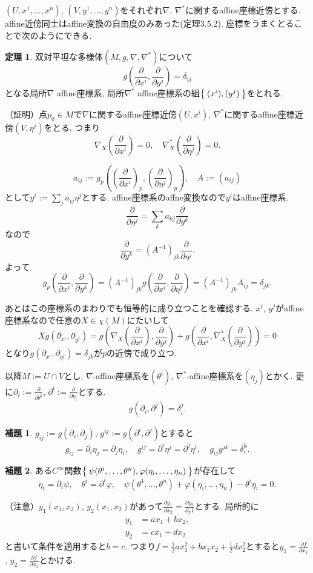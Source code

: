 \documentclass{jsarticle}
\newcommand{\half}{\frac{1}{2}}
\newcommand{\con}{\nabla}
\newcommand{\dcon}{\con^{*}}
\newcommand{\marud}[1]{\partial_{#1}}
\newcommand{\marudd}[1]{\frac{\partial}{\partial #1}}
\theoremstyle{definition}
\newtheorem{theorem}{定理}
\newtheorem{lemma}{補題}
\numberwithin{theorem}{section}
\begin{document}
$(U, x^1, \dots, x^n)$, $(V, y^1, \dots, y^n)$をそれぞれ$\con$, $\dcon$に関するaffine座標近傍とする.
affine近傍同士はaffine変換の自由度のみあった(定理3.5.2).
座標をうまくとることで次のようにできる.
\begin{theorem}
双対平坦な多様体$(M,g,\con,\dcon)$について
\[
g(\marudd{x^i}, \marudd{y^j})=\delta_{ij}
\]
となる局所$\con$ affine座標系, 局所$\dcon$ affine座標系の組$\Set{(x^i),(y^j)}$をとれる.
\end{theorem}

（証明）点$p_0 \in M$で$\con$に関するaffine座標近傍$(U,x^i)$, $\dcon$に関するaffine座標近傍$(V,\eta^j)$をとる.
つまり
\[
\con_X\left(\marudd{x^i}\right)=0, \quad \dcon_X\left(\marudd{\eta^j}\right)=0.
\]

\[
a_{ij}:=g_p((\marudd{x^i})_p, (\marudd{\eta^j})_p), \quad A:=(a_{ij})
\]
として$y^i:=\sum_j a_{ij} \eta^j$とする.
affine座標系のaffne変換なので$y^i$はaffine座標系.
\[
\marudd{\eta^j}=\sum_k a_{kj} \marudd{y^k}
\]
なので
\[
\marudd{y^k}=(A^{-1})_{jk} \marudd{\eta^j}.
\]
よって
\[
g_p(\marudd{x^i},\marudd{y^k})=(A^{-1})_{jk}g(\marudd{x^i},\marudd{\eta^j})=(A^{-1})_{jk}A_{ij}=\delta_{jk}.
\]

あとはこの座標系のまわりでも恒等的に成り立つことを確認する.
$x^i$, $y^j$がaffine座標系なので任意の$X \in \chi(M)$にたいして
\[
Xg(\marud{x^i},\marud{y^j})=g(\con_X(\marudd{x^i}),\marudd{y^j})+g(\marudd{x^i},\dcon_X(\marudd{y^j}))=0
\]
となり$g(\marud{x^i},\marud{y^j})=\delta_{jk}$が$p$の近傍で成り立つ.

以降$M:=U \cap V$とし, $\con$-affine座標系を$(\theta^i)$, $\dcon$-affine座標系を$(\eta_j)$とかく.
更に$\partial_i:=\marudd{\theta^i}$, $\partial^i:=\marudd{\eta_i}$とする.
\[
g(\partial_i,\partial^j)=\delta_i^j.
\]

\begin{lemma}
$g_{ij}:=g(\partial_i,\partial_j)$, $g^{ij}:=g(\partial^i, \partial^j)$とすると
\[
g_{ij}=\partial_i \eta_j=\partial_j \eta_i, \quad g^{ij}=\partial^i \eta^j = \partial^j \eta^i, \quad g_{ij}g^{jk}=\delta_i^k.
\]
\end{lemma}

\begin{lemma}
ある$C^\infty$関数$\Set{\psi(\theta^i,\dots,\theta^n), \varphi(\eta_i,\dots,\eta_n)}$が存在して
\[
\eta_i=\partial_i\psi, \quad \theta^i=\partial^i \varphi, \quad \psi(\theta^1, \dots, \theta^n)+\varphi(\eta_i,\dots,\eta_n)-\theta^i \eta_i=0.
\]
\end{lemma}
（注意）$y_1(x_1,x_2)$, $y_2(x_1,x_2)$があって$\frac{\partial y_1}{\partial x_2}=\frac{\partial y_2}{\partial_x1}$とする.
局所的に
\begin{eqnarray*}
y_1&=a x_1+b x_2,\\
y_2&=c x_1+d x_2
\end{eqnarray*}
と書いて条件を適用すると$b=c$.
つまり$f=\half a x_1^2+b x_1 x_2 + \half d x_2^2$とすると$y_1=\frac{\partial f}{\partial x_1}$, $y_2=\frac{\partial f}{\partial x_2}$とかける.
\end{document}
